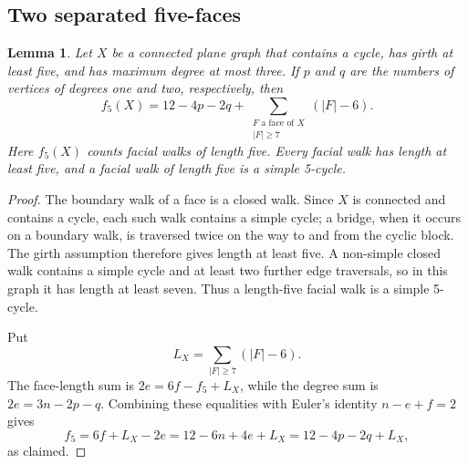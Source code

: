 \documentclass[11pt]{article}
\newtheorem{lemma}[theorem]{Lemma}
\theoremstyle{remark}
\numberwithin{equation}{section}
\numberwithin{table}{section}
\begin{document}
\subsection{Two separated five-faces}
\begin{lemma}\label{lem:subcubic-face-count}
Let $X$ be a connected plane graph that contains a cycle, has girth at
least five, and has maximum degree at most three.  If $p$ and $q$ are
the numbers of vertices of degrees one and two, respectively, then
\[
 f_5(X)=12-4p-2q+
 \sum_{\substack{F\text{ a face of }X\\ |F|\ge7}}(|F|-6).
 \tag{FC}
\]
Here $f_5(X)$ counts facial walks of length five.  Every facial walk
has length at least five, and a facial walk of length five is a simple
5-cycle.
\end{lemma}
\begin{proof}
The boundary walk of a face is a closed walk.  Since $X$ is connected
and contains a cycle, each such walk contains a simple cycle; a bridge,
when it occurs on a boundary walk, is traversed twice on the way to and
from the cyclic block.  The girth assumption therefore gives length at
least five.  A non-simple closed walk contains a simple cycle and at
least two further edge traversals, so in this graph it has length at
least seven.  Thus a length-five facial walk is a simple 5-cycle.

Put
\[
 L_X=\sum_{|F|\ge7}(|F|-6).
\]
The face-length sum is $2e=6f-f_5+L_X$, while the degree sum is
$2e=3n-2p-q$.  Combining these equalities with Euler's identity
$n-e+f=2$ gives
\[
 f_5=6f+L_X-2e
     =12-6n+4e+L_X
     =12-4p-2q+L_X,
\]
as claimed.
\end{proof}
\end{document}
